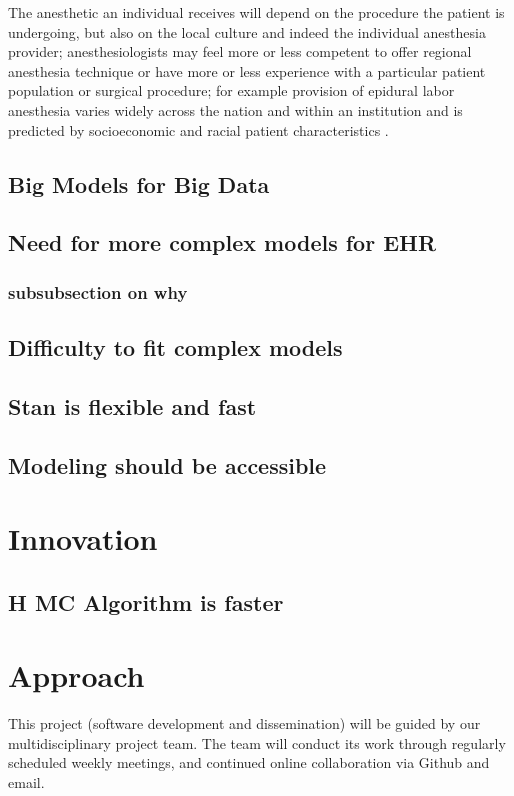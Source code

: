 \documentclass[11pt,notitlepage]{article}
\begin{document}
The anesthetic an individual receives will depend on the procedure the patient is undergoing, but also on the local culture and indeed the individual anesthesia provider\cite{AndreaeWhite2015}; anesthesiologists may feel more or less competent to offer regional anesthesia technique or have more or less experience with a particular patient population or surgical procedure; for example provision of epidural labor anesthesia varies widely across the nation and within an institution and is predicted by socioeconomic and racial patient characteristics \cite{Rust2004,Glance2007}. 



\subsection*{Big Models for Big Data}

\subsection*{Need for more complex models for EHR}

\subsubsection*{subsubsection on why}

\subsection*{Difficulty to fit complex models}

\subsection*{Stan is flexible and fast}

\subsection*{Modeling should be accessible}

\section*{Innovation}

\subsection*{H MC Algorithm is faster}

\section*{Approach}
This project (software development and dissemination) will be guided by our multidisciplinary project team. The team will conduct its work through regularly scheduled weekly meetings, and continued online collaboration via Github and email. 
\end{document}
